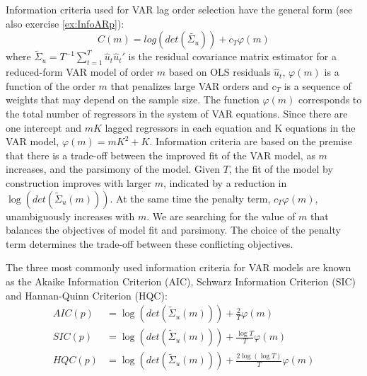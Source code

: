 Information criteria used for VAR lag order selection have the general form (see also exercise \ref{ex:InfoARp}):
$$C(m) = log(det(\tilde{\Sigma_u})) + c_T \varphi(m)$$
where $\tilde{\Sigma}_u=T^{-1}\sum_{t=1}^T \hat{u}_t\hat{u}_t'$ is the residual covariance matrix estimator for a reduced-form VAR model of order $m$ based on OLS residuals $\hat{u}_t$, $\varphi(m)$ is a function of the order $m$ that penalizes large VAR orders and $c_T$ is a sequence of weights that may depend on the sample size.
The function $\varphi(m)$ corresponds to the total number of regressors in the system of VAR equations. Since there are one intercept and $mK$ lagged regressors in each equation and K equations in the VAR model, $\varphi(m)= mK^2 + K$. Information criteria are based on the premise that there is a trade-off between the improved fit of the VAR model, as $m$ increases, and the parsimony of the model. Given $T$, the fit of the model by construction improves with larger $m$, indicated by a reduction in $\log(det(\tilde{\Sigma}_u(m)))$. At the same time the penalty term, $c_T \varphi(m)$, unambiguously increases with $m$. We are searching for the value of $m$ that balances the objectives of model fit and parsimony. The choice of the penalty term determines the trade-off between these conflicting objectives.

The three most commonly used information criteria for VAR models are known as the Akaike Information Criterion (AIC), Schwarz Information Criterion (SIC) and Hannan-Quinn Criterion (HQC):
\begin{align*}
    AIC(p) & = \log(det(\tilde{\Sigma}_u(m))) + \frac{2}{T}\varphi(m)              \\
    SIC(p) & = \log(det(\tilde{\Sigma}_u(m))) + \frac{\log T}{T}\varphi(m)         \\
    HQC(p) & = \log(det(\tilde{\Sigma}_u(m))) + \frac{2\log (\log T)}{T}\varphi(m)
\end{align*}

